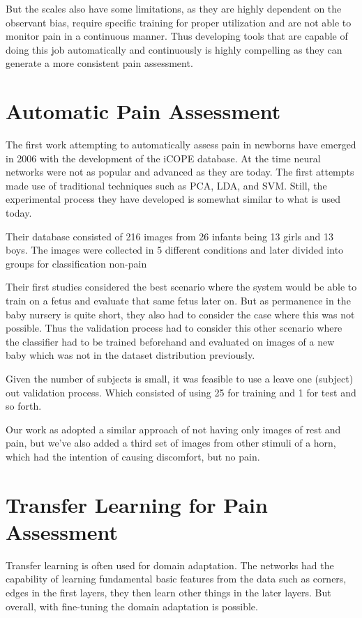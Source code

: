 But the scales also have some limitations, as they are highly dependent on the observant bias, require specific training for proper utilization and are not able to monitor pain in a continuous manner. Thus developing tools that are capable of doing this job automatically and continuously is highly compelling as they can generate a more consistent pain assessment.

\section{Automatic Pain Assessment}

The first work attempting to automatically assess pain in newborns have emerged in 2006  with the development of the iCOPE database. At the time neural networks were not as popular and advanced as they are today. The first attempts made use of traditional techniques such as PCA, LDA, and SVM. Still, the experimental process they have developed is somewhat similar to what is used today. 

Their database consisted of 216 images from 26 infants being 13 girls and 13 boys. The images were collected in 5 different conditions and later divided into groups for classification non-pain


Their first studies considered the best scenario where the system would be able to train on a fetus and evaluate that same fetus later on. But as permanence in the baby nursery is quite short, they also had to consider the case where this was not possible. Thus the validation process had to consider this other scenario where the classifier had to be trained beforehand and evaluated on images of a new baby which was not in the dataset distribution previously.

Given the number of subjects is small, it was feasible to use a leave one (subject) out validation process. Which consisted of using 25 for training and 1 for test and so forth.

Our work as adopted a similar approach of not having only images of rest and pain, but we've also added a third set of images from other stimuli of a horn, which had the intention of causing discomfort, but no pain. 

\section{Transfer Learning for Pain Assessment}

Transfer learning is often used for domain adaptation. The networks had the capability of learning fundamental basic features from the data such as corners, edges in the first layers, they then learn other things in the later layers. But overall, with fine-tuning the domain adaptation is possible.